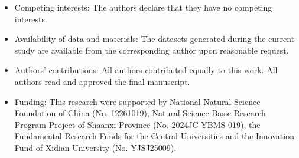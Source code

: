 \documentclass[hidelinks,11 pt]{article}
\numberwithin{equation}{section}
\theoremstyle{definition}  %
\numberwithin{equation}{section}
\numberwithin{theorem}{section}
\begin{document}
\begin{itemize}
\item Competing interests: The authors declare that they have no competing interests.
\item Availability of data and materials: The datasets generated during the current study are available from the corresponding author upon reasonable request.
\item Authors' contributions: All authors contributed equally to this work. All authors read and approved the final manuscript.
\item Funding: 
This research were supported by National Natural Science Foundation of China (No. 12261019), Natural Science Basic Research Program Project of Shaanxi Province (No. 2024JC-YBMS-019), the Fundamental Research Funds for the Central Universities and the Innovation Fund of Xidian University (No. YJSJ25009).
\end{itemize}
\end{document}
